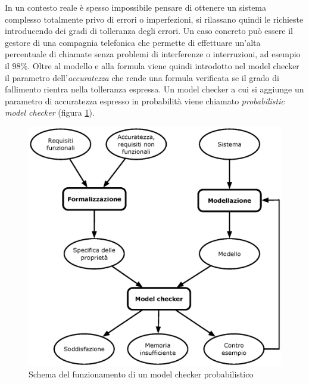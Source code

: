 In un contesto reale è spesso impossibile pensare di ottenere un sistema complesso totalmente privo di errori o imperfezioni, si rilassano quindi le richieste introducendo dei gradi di tolleranza degli errori. Un caso concreto può essere il gestore di una compagnia telefonica che permette di effettuare un'alta percentuale di chiamate senza problemi di interferenze o interruzioni, ad esempio il $98\%$. Oltre al modello e alla formula viene quindi introdotto nel model checker il parametro dell'\emph{accuratezza} che rende una formula verificata se il grado di fallimento rientra nella tolleranza espressa. Un model checker a cui si aggiunge un parametro di accuratezza espresso in probabilità viene chiamato \emph{probabilistic model checker} (figura \ref{fig:probabilisticmodelchecker}).
\begin{figure}[htb]
	\begin{center}
		\includegraphics[width=\textwidth]{Images/pmc.eps}
	\end{center}
\caption{Schema del funzionamento di un model checker probabilistico}
\label{fig:probabilisticmodelchecker}
\end{figure}

